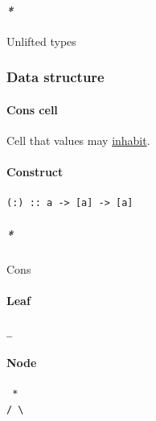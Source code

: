 \documentclass[11pt]{article}
\begin{document}
\paragraph{\emph{*}}
\label{sec:orgb0718e2}

\label{orgb49b699}Unlifted types\\

\subsubsection{\label{org47669ca}Data structure}
\label{sec:org21769d9}
\paragraph{\label{orgaca50c2}Cons cell}
\label{sec:org51f1676}
Cell that values may \hyperref[org57e1f17]{inhabit}.\\

\paragraph{\label{orgc1046f9}Construct}
\label{sec:org7eae86c}
\begin{verbatim}
(:) :: a -> [a] -> [a]
\end{verbatim}

\subparagraph{\emph{*}}
\label{sec:org36f5f23}

\label{org3f167f2}Cons\\

\paragraph{\label{orgdd1762f}Leaf}
\label{sec:orge6f406f}
\begin{verbatim}
_
\end{verbatim}

\paragraph{\label{org25ccf6c}Node}
\label{sec:orgb8c2694}
\begin{verbatim}
 *
/ \
\end{verbatim}
\end{document}
